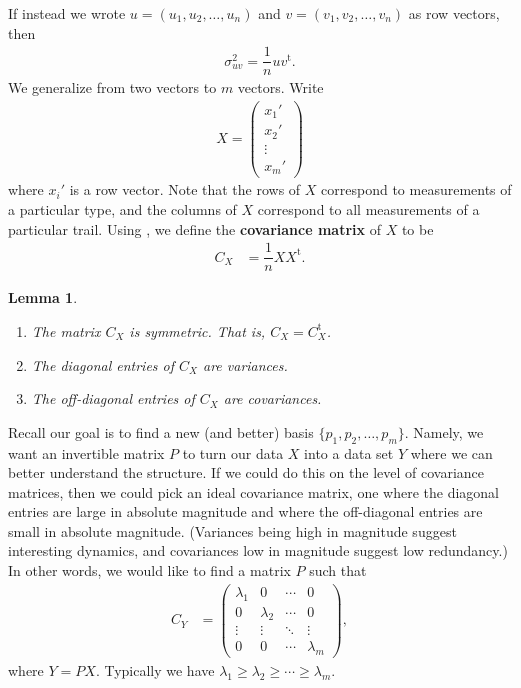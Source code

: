 \documentclass[a4paper, 12pt]{article}
\numberwithin{equation}{section}
\numberwithin{figure}{section}
\newtheorem{lem}[thm]{Lemma}
\theoremstyle{definition}
\renewcommand{\geq}{\geqslant}
\newcommand{\tr}{\mathrm{t}}
\begin{document}
If instead we wrote $u = (u_1, u_2, \dots, u_n)$ and $v= (v_1,v_2, \dots, v_n)$
as row vectors, then 
\begin{align}\label{eqn:vec-covar}
	\sigma_{uv}^2 = \dfrac{1}{n} u v^{\tr}. 
\end{align} 
We generalize from two vectors to $m$ vectors. Write 
\begin{align*}
	X = \begin{pmatrix}
		x_1' \\ x_2' \\ \vdots \\ x_m'
	\end{pmatrix}
\end{align*}
where $x_i'$ is a row vector. Note that the rows of $X$ correspond to
measurements of a particular type, and the columns of $X$ correspond to all
measurements of a particular trail. Using , we define the
\textbf{covariance matrix} of $X$ to be 
\begin{align*} 
	C_X &= \dfrac{1}{n} XX^{\tr} .
\end{align*} 

\begin{lem}\label{lem:covariance-properties}
	\begin{enumerate}
		\item The matrix $C_X$ is symmetric. That is, $C_X = C_X^{\tr}$.
		\item The diagonal entries of $C_X$ are variances.
		\item The off-diagonal entries of $C_X$ are covariances.
	\end{enumerate}
\end{lem}

Recall our goal is to find a new (and better) basis $\{p_1, p_2, \dots, p_m\}$.
Namely, we want an invertible matrix $P$ to turn our data $X$ into a data set
$Y$ where we can better understand the structure. If we could do this on the
level of covariance matrices, then we could pick an ideal covariance matrix, one
where the diagonal entries are large in absolute magnitude and where the
off-diagonal entries are small in absolute magnitude. (Variances being high in
magnitude suggest interesting dynamics, and covariances low in magnitude suggest
low redundancy.) In other words, we would like to find a matrix $P$ such that 
\begin{align}\label{eqn:cov-Y}
	C_Y &= \begin{pmatrix}
		\lambda_1 & 0 & \cdots & 0 \\
		0 & \lambda_2 & \cdots & 0 \\
		\vdots & \vdots & \ddots & \vdots \\
		0 & 0 & \cdots & \lambda_m
	\end{pmatrix},
\end{align}
where $Y = PX$. Typically we have $\lambda_1 \geq \lambda_2 \geq \cdots \geq \lambda_m$.
\end{document}
